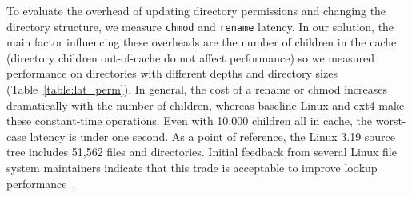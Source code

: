 To evaluate the overhead of updating directory permissions and changing the directory structure,
we measure {\tt chmod} and {\tt rename} latency.
In our solution, the main factor influencing these overheads are the number of children
in the cache (directory children out-of-cache do not affect performance)
so we measured performance on directories with different depths and directory sizes
(Table~\ref{table:lat_perm}).
In general, the cost of a rename or chmod increases dramatically with the number of children,
whereas baseline Linux and ext4 make these constant-time operations.
Even with 10,000 children all in cache, the worst-case latency is under one second.
As a point of reference, the Linux 3.19 source tree includes 51,562 files and directories.
Initial feedback from several Linux file system maintainers indicate that this trade is acceptable
to improve lookup performance~\cite{linux-forum}.

\begin{comment}
\begin{table}[t]
\scriptsize
\centering
\begin{tabular}{|l|rr|rrr|}
\hline
Types & \multicolumn{2}{c|}{Unmodified kernel} & \multicolumn{3}{c|}{Optimized kernel}  \\
& $\upmu$s & +/- & $\upmu$s & +/- & Overhead \\
\hline
{\tt ext4} & 0000.00 & .00 & 0000.00 & .00 & 00.0 \% \\
\hline
{\tt proc} & 0000.00 & .00 & 0000.00 & .00 & 00.0 \% \\
\hline
{\tt sysfs} & 0000.00 & .00 & 0000.00 & .00 & 00.0 \% \\
\hline
{\tt dev} & 0000.00 & .00 & 0000.00 & .00 & 00.0 \% \\
\hline
\end{tabular}
\caption{Latency of {\tt mount} / {\tt umount}, for creating and removing mount point based on file system types. Lower is better.}
\label{table:lat_mount}
\end{table}
\end{comment}

